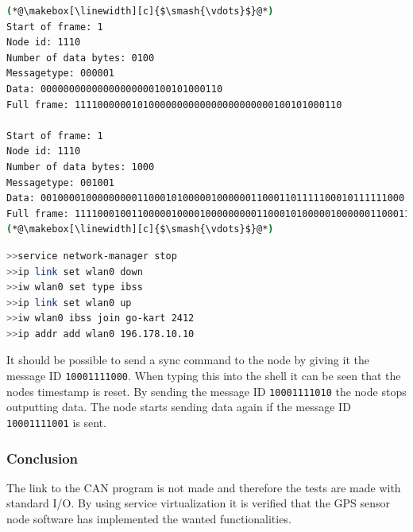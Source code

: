 \begin{lstlisting}[language=bash]
(*@\makebox[\linewidth][c]{$\smash{\vdots}$}@*)
Start of frame: 1
Node id: 1110
Number of data bytes: 0100
Messagetype: 000001
Data: 00000000000000000000100101000110
Full frame: 11110000001010000000000000000000000100101000110

Start of frame: 1
Node id: 1110
Number of data bytes: 1000
Messagetype: 001001
Data: 0010000100000000011000101000001000000110001101111100010111111000
Full frame: 1111000100110000010000100000000011000101000001000000110001101111100010111111000
(*@\makebox[\linewidth][c]{$\smash{\vdots}$}@*)
\end{lstlisting}

\begin{lstlisting}[language=bash]
>>service network-manager stop
>>ip link set wlan0 down
>>iw wlan0 set type ibss
>>ip link set wlan0 up
>>iw wlan0 ibss join go-kart 2412
>>ip addr add wlan0 196.178.10.10
\end{lstlisting}



It should be possible to send a sync command to the node by giving it the message ID \texttt{10001111000}.
When typing this into the shell it can be seen that the nodes timestamp is reset.
By sending the message ID \texttt{10001111010} the node stops outputting data.
The node starts sending data again if the message ID \texttt{10001111001} is sent.


\subsubsection*{Conclusion}
The link to the CAN program is not made and therefore the tests are made with standard I/O.
By using service virtualization it is verified that the GPS sensor node software has implemented the wanted functionalities.
